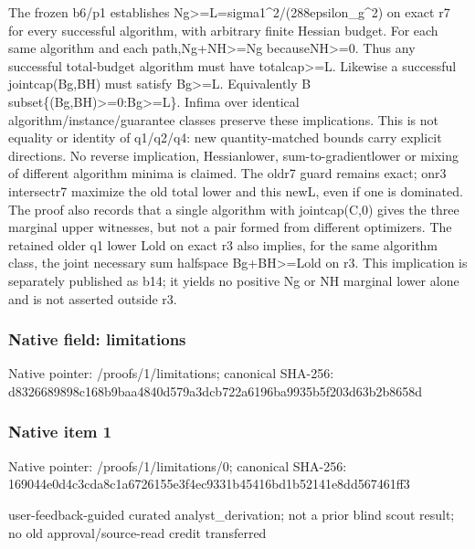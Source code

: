 \documentclass[10pt,a4paper]{article}
\begin{document}
\begingroup\raggedright\sloppy The frozen b6/\allowbreak{}p1 establishes Ng>=\allowbreak{}L=\allowbreak{}sigma1\textasciicircum{}2/\allowbreak{}(288epsilon\_\allowbreak{}g\textasciicircum{}2) on exact r7 for every successful algorithm,\allowbreak{} with arbitrary finite Hessian budget. For each same algorithm and each path,\allowbreak{}Ng+NH>=\allowbreak{}Ng becauseNH>=\allowbreak{}0. Thus any successful total-budget algorithm must have totalcap>=\allowbreak{}L. Likewise a successful jointcap(Bg,\allowbreak{}BH) must satisfy Bg>=\allowbreak{}L. Equivalently B subset\{(Bg,\allowbreak{}BH)>=\allowbreak{}0:\allowbreak{}Bg>=\allowbreak{}L\}. Infima over identical algorithm/\allowbreak{}instance/\allowbreak{}guarantee classes preserve these implications. This is not equality or identity of q1/\allowbreak{}q2/\allowbreak{}q4:\allowbreak{} new quantity-matched bounds carry explicit directions. No reverse implication,\allowbreak{} Hessianlower,\allowbreak{} sum-to-gradientlower or mixing of different algorithm minima is claimed. The oldr7 guard remains exact;\allowbreak{} onr3 intersectr7 maximize the old total lower and this newL,\allowbreak{} even if one is dominated. The proof also records that a single algorithm with jointcap(C,\allowbreak{}0) gives the three marginal upper witnesses,\allowbreak{} but not a pair formed from different optimizers. The retained older q1 lower Lold on exact r3 also implies,\allowbreak{} for the same algorithm class,\allowbreak{} the joint necessary sum halfspace Bg+BH>=\allowbreak{}Lold on r3. This implication is separately published as b14;\allowbreak{} it yields no positive Ng or NH marginal lower alone and is not asserted outside r3.\par\endgroup

\subsubsection{Native field: limitations}
Native pointer: /proofs/1/limitations; canonical SHA-256: d8326689898c168b9baa4840d579a3dcb722a6196ba9935b5f203d63b2b8658d

\subsubsection{Native item 1}
Native pointer: /proofs/1/limitations/0; canonical SHA-256: 169044e0d4c3cda8c1a6726155e3f4ec9331b45416bd1b52141e8dd567461ff3

\begingroup\raggedright\sloppy user-feedback-guided curated analyst\_\allowbreak{}derivation;\allowbreak{} not a prior blind scout result;\allowbreak{} no old approval/\allowbreak{}source-read credit transferred\par\endgroup
\end{document}
